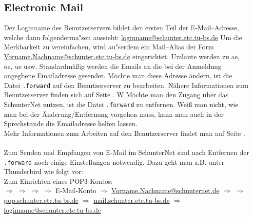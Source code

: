 
\subsection{Electronic Mail}
Der Loginname des Benutzerservers bildet den ersten Teil der \glossar
E-Mail--Adresse, welche dann folgenderma"sen aussieht:
\url{loginname@schunter.etc.tu-bs.de}
Um die Merkbarkeit zu vereinfachen, wird au"serdem ein Mail--Alias der Form
\url{Vorname.Nachname@schunter.etc.tu-bs.de} eingerichtet. Umlaute werden zu
ae, oe, ue usw.  Standardmäßig werden die Emails an die bei der
Anmeldung angegbene Emailadresse gesendet. Möchte man diese Adresse
ändern, ist die Datei \texttt{.forward} auf den Benutzerserver zu
bearbeiten. Nähere Informationen zum Benutzerserver finden sich auf
Seite \pageref{benutzerserver}. W
Möchte man den Zugang über das SchunterNet nutzen, ist die Datei \texttt{.forward} zu
entfernen.
Weiß man nicht, wie man bei der Änderung/Entfernung vorgehen 
muss, kann man auch in der \glossar Sprechstunde die Emailadresse
helfen lassen.\\
Mehr Informationen zum Arbeiten auf den Benutzerserver %
findet man auf Seite \pageref{benutzerserver}.\\\\
Zum Senden und Empfangen von E-Mail im SchunterNet sind nach Entfernen
der \texttt{.forward} noch einige Einstellungen notwendig. Dazu geht man z.B. unter
Thunderbird wie folgt vor:\\
Zum Einrichten eines POP3-Kontos:\\
 $\Rightarrow$  $\Rightarrow$
 $\Rightarrow$  $\Rightarrow$
\mbox{E-Mail-Konto} $\Rightarrow$ 
\mbox{\url{Vorname.Nachname@schunternet.de}} $\Rightarrow$ 
$\Rightarrow$ 
\mbox{\url{pop.schunter.etc.tu-bs.de}}
$\Rightarrow$ 
\mbox{\url{mail.schunter.etc.tu-bs.de}} $\Rightarrow$ 
\mbox{\url{loginname@schunter.etc.tu-bs.de}}\\
\\

